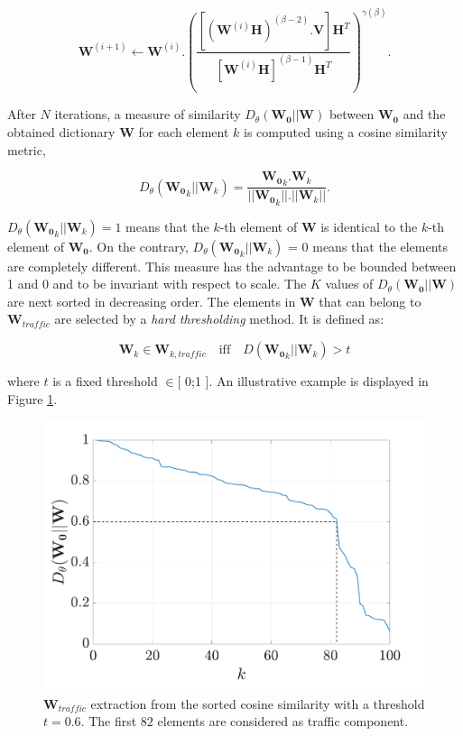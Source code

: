 \documentclass[twocolumn]{svjour3}          %
\begin{document}
\begin{equation}\label{eq:updateW_unsup}
\textbf{W}^{(i+1)} \leftarrow \mathbf{W}^{(i)}.\left(\frac{\left[\left(\mathbf{W}^{(i)}\mathbf{H} \right)^{(\beta-2)}.\mathbf{V} \right]\mathbf{H}^T}{\left[\mathbf{W}^{(i)}\mathbf{H} \right]^{(\beta-1)}\mathbf{H}^T}\right)^{\gamma(\beta)}.
\end{equation}

After $N$ iterations, a measure of similarity $D_{\theta}\left(\mathbf{W_0} \vert \vert \mathbf{W} \right)$ between $\mathbf{W_0}$ and the obtained dictionary $\mathbf{W}$ for each element $k$ is computed using a cosine similarity metric,

\begin{equation}
D_{\theta}\left(\mathbf{W_0}_k \vert \vert \mathbf{W}_k \right) = \frac{\mathbf{W_0}_k.\mathbf{W}_k}{\vert \vert \mathbf{W_0}_k  \vert \vert . \vert \vert \mathbf{W}_k \vert \vert}.
\end{equation}

$D_{\theta}\left(\mathbf{W_0}_k \vert \vert \mathbf{W}_k \right) = 1$ means that the $k$-th element of $\mathbf{W}$ is identical to the $k$-th element of $\mathbf{W_0}$. On the contrary, $D_{\theta}\left(\mathbf{W_0}_k \vert \vert \mathbf{W}_k \right)$ = 0 means that the elements are completely different. This measure has the advantage to be bounded between 1 and 0 and to be invariant with respect to scale. The $K$ values of $D_{\theta}\left(\mathbf{W_0} \vert \vert \mathbf{W} \right)$ are next sorted in decreasing order. The elements in $\mathbf{W}$ that can belong to $\mathbf{W}_{traffic}$ are selected by a \textit{hard thresholding} method. It is defined as:

\begin{equation}
\mathbf{W}_k \in \mathbf{W}_{k,traffic} \quad \text{iff} \quad D\left(\mathbf{W_0}_k \vert \vert \mathbf{W}_{k} \right) > t
\end{equation}

where $t$ is a fixed threshold $\in [$ 0;1 $]$.
An illustrative example is displayed in Figure \ref{fig:W_TI_NMF}.\\

\begin{figure}[t]
\centering
\includegraphics[width=0.8\linewidth]{figures/distanceCosLinDisplay.pdf}
\caption{$\mathbf{W}_{traffic}$ extraction from the sorted cosine similarity with a threshold $t = 0.6$. The first $82$ elements are considered as traffic component.}
\label{fig:W_TI_NMF}
\end{figure}
\end{document}
